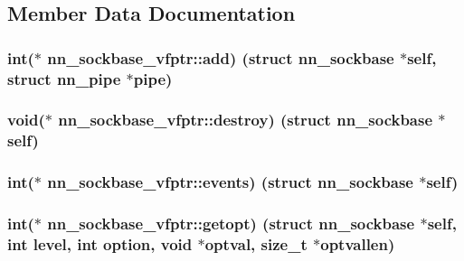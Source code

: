 \subsection{Member Data Documentation}
\subsubsection[{add}]{\setlength{\rightskip}{0pt plus 5cm}int($\ast$ nn\+\_\+sockbase\+\_\+vfptr\+::add) (struct {\bf nn\+\_\+sockbase} $\ast$self, struct nn\+\_\+pipe $\ast$pipe)}\hypertarget{structnn__sockbase__vfptr_aa9a9206a0c9227cd3f4c1852d924b761}{}\label{structnn__sockbase__vfptr_aa9a9206a0c9227cd3f4c1852d924b761}
\subsubsection[{destroy}]{\setlength{\rightskip}{0pt plus 5cm}void($\ast$ nn\+\_\+sockbase\+\_\+vfptr\+::destroy) (struct {\bf nn\+\_\+sockbase} $\ast$self)}\hypertarget{structnn__sockbase__vfptr_a034461ee8795802694e82d917c2f7600}{}\label{structnn__sockbase__vfptr_a034461ee8795802694e82d917c2f7600}
\subsubsection[{events}]{\setlength{\rightskip}{0pt plus 5cm}int($\ast$ nn\+\_\+sockbase\+\_\+vfptr\+::events) (struct {\bf nn\+\_\+sockbase} $\ast$self)}\hypertarget{structnn__sockbase__vfptr_a6423947b5789f6a86daf300fc553fec0}{}\label{structnn__sockbase__vfptr_a6423947b5789f6a86daf300fc553fec0}
\subsubsection[{getopt}]{\setlength{\rightskip}{0pt plus 5cm}int($\ast$ nn\+\_\+sockbase\+\_\+vfptr\+::getopt) (struct {\bf nn\+\_\+sockbase} $\ast$self, int level, int option, void $\ast$optval, size\+\_\+t $\ast$optvallen)}\hypertarget{structnn__sockbase__vfptr_a0251c54dcd65d0c0524cbd0a7068d7f9}{}\label{structnn__sockbase__vfptr_a0251c54dcd65d0c0524cbd0a7068d7f9}
